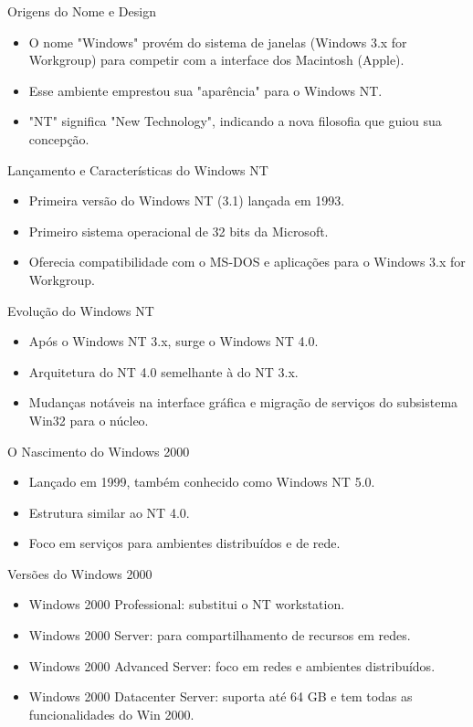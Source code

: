 \documentclass{beamer}
\begin{document}
\begin{frame}{Origens do Nome e Design}
    \begin{itemize}
        \item O nome "Windows" provém do sistema de janelas (Windows 3.x for Workgroup) para competir com a interface dos Macintosh (Apple).
        \item Esse ambiente emprestou sua "aparência" para o Windows NT.
        \item "NT" significa "New Technology", indicando a nova filosofia que guiou sua concepção.
    \end{itemize}
\end{frame}

\begin{frame}{Lançamento e Características do Windows NT}
    \begin{itemize}
        \item Primeira versão do Windows NT (3.1) lançada em 1993.
        \item Primeiro sistema operacional de 32 bits da Microsoft.
        \item Oferecia compatibilidade com o MS-DOS e aplicações para o Windows 3.x for Workgroup.
    \end{itemize}
\end{frame}
\begin{frame}{Evolução do Windows NT}
    \begin{itemize}
        \item Após o Windows NT 3.x, surge o Windows NT 4.0.
        \item Arquitetura do NT 4.0 semelhante à do NT 3.x.
        \item Mudanças notáveis na interface gráfica e migração de serviços do subsistema Win32 para o núcleo.
    \end{itemize}
\end{frame}

\begin{frame}{O Nascimento do Windows 2000}
    \begin{itemize}
        \item Lançado em 1999, também conhecido como Windows NT 5.0.
        \item Estrutura similar ao NT 4.0.
        \item Foco em serviços para ambientes distribuídos e de rede.
    \end{itemize}
\end{frame}

\begin{frame}{Versões do Windows 2000}
    \begin{itemize}
        \item Windows 2000 Professional: substitui o NT workstation.
        \item Windows 2000 Server: para compartilhamento de recursos em redes.
        \item Windows 2000 Advanced Server: foco em redes e ambientes distribuídos.
        \item Windows 2000 Datacenter Server: suporta até 64 GB e tem todas as funcionalidades do Win 2000.
    \end{itemize}
\end{frame}
\end{document}
